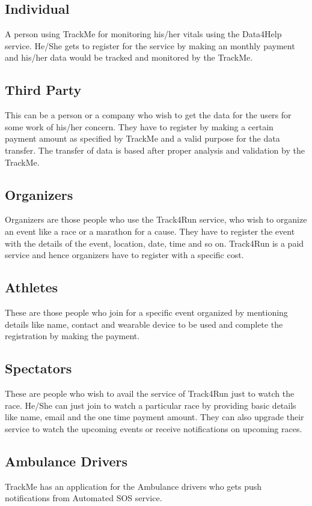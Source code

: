 \subsection{Individual}
A person using TrackMe for monitoring his/her vitals using the Data4Help service. He/She gets to register for the service by making an monthly payment and his/her data would be tracked and monitored by the TrackMe.
\subsection{Third Party} 
This can be a person or a company who wish to get the data for the users for some work of his/her concern. They have to register by making a certain payment amount as specified by TrackMe and a valid purpose for the data transfer. The transfer of data is based after proper analysis and validation by the TrackMe.
\subsection{Organizers}
Organizers are those people who use the Track4Run service, who wish to organize an event like a race or a marathon for a cause. They have to register the event with the details of the event, location, date, time and so on. Track4Run is a paid service and hence organizers have to register with a specific cost.
\subsection{Athletes} 
These are those people who join for a specific event organized by mentioning details like name, contact and wearable device to be used and complete the registration by making the payment.
\subsection{Spectators}
These are people who wish to avail the service of Track4Run just to watch the race. He/She can just join to watch a particular race by providing basic details like name, email and the one time payment amount. They can also upgrade their service to watch the upcoming events or receive notifications on upcoming races.
\subsection{Ambulance Drivers}
TrackMe has an application for the Ambulance drivers who gets push notifications from Automated SOS service.  
